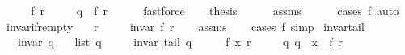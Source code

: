 \begin{isabellebody}
%
\isadelimproof
%
\endisadelimproof
%
\isatagproof
{}\isamarkupfalse%
\ {\isacharminus}{\kern0pt}\isanewline
\ \ \isamarkupfalse%
\ f\ r\ \isanewline
\ \ \ \ {\isachardoublequoteopen}q\ {\isacharequal}{\kern0pt}\ {\isacharparenleft}{\kern0pt}f{\isacharcomma}{\kern0pt}\ r{\isacharparenright}{\kern0pt}{\isachardoublequoteclose}\isanewline
\ \ \ \ \isamarkupfalse%
\ fastforce\isanewline
\ \ \isamarkupfalse%
\ {\isacharquery}{\kern0pt}thesis\isanewline
\ \ \ \ \isamarkupfalse%
\ assms\isanewline
\ \ \ \ \isamarkupfalse%
\ {\isacharparenleft}{\kern0pt}cases\ f{\isacharparenright}{\kern0pt}\ auto\isanewline
{}\isamarkupfalse%
%
\endisatagproof
{\isafoldproof}%
%
\isadelimproof
\isanewline
%
\endisadelimproof
\isanewline
{}\isamarkupfalse%
\ invar{\isacharunderscore}{\kern0pt}if{\isacharunderscore}{\kern0pt}r{\isacharunderscore}{\kern0pt}empty{\isacharcolon}{\kern0pt}\isanewline
\ \ \ {\isachardoublequoteopen}r\ {\isacharequal}{\kern0pt}\ {\isacharbrackleft}{\kern0pt}{\isacharbrackright}{\kern0pt}{\isachardoublequoteclose}\isanewline
\ \ \ {\isachardoublequoteopen}invar\ {\isacharparenleft}{\kern0pt}f{\isacharcomma}{\kern0pt}\ r{\isacharparenright}{\kern0pt}{\isachardoublequoteclose}\isanewline
%
\isadelimproof
\ \ %
\endisadelimproof
%
\isatagproof
{}\isamarkupfalse%
\ assms\isanewline
\ \ \isamarkupfalse%
\ {\isacharparenleft}{\kern0pt}cases\ f{\isacharparenright}{\kern0pt}\ simp{\isacharplus}{\kern0pt}%
\endisatagproof
{\isafoldproof}%
%
\isadelimproof
\isanewline
%
\endisadelimproof
\isanewline
{}\isamarkupfalse%
\ invar{\isacharunderscore}{\kern0pt}tail{\isacharcolon}{\kern0pt}\isanewline
\ \ \ {\isachardoublequoteopen}invar\ q{\isachardoublequoteclose}\isanewline
\ \ \ {\isachardoublequoteopen}list\ q\ {\isasymnoteq}\ {\isacharbrackleft}{\kern0pt}{\isacharbrackright}{\kern0pt}{\isachardoublequoteclose}\isanewline
\ \ \ {\isachardoublequoteopen}invar\ {\isacharparenleft}{\kern0pt}tail\ q{\isacharparenright}{\kern0pt}{\isachardoublequoteclose}\isanewline
%
\isadelimproof
%
\endisadelimproof
%
\isatagproof
{}\isamarkupfalse%
\ {\isacharminus}{\kern0pt}\isanewline
\ \ \isamarkupfalse%
\ f\ x\ r\ \isanewline
\ \ \ \ q{\isacharcolon}{\kern0pt}\ {\isachardoublequoteopen}q\ {\isacharequal}{\kern0pt}\ {\isacharparenleft}{\kern0pt}x\ {\isacharhash}{\kern0pt}\ f{\isacharcomma}{\kern0pt}\ r{\isacharparenright}{\kern0pt}{\isachardoublequoteclose}\isanewline

\end{isabellebody}
